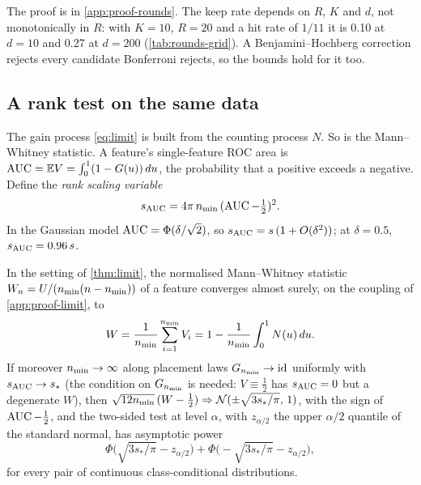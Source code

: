 The proof is in \cref{app:proof-rounds}. The keep rate depends on $R$, $K$ and $d$, not monotonically in $R$: with $K = 10$, $R = 20$ and a hit rate of $1/11$ it is 0.10 at $d = 10$ and 0.27 at $d = 200$ (\cref{tab:rounds-grid}). A Benjamini--Hochberg correction rejects every candidate Bonferroni rejects, so the bounds hold for it too.

\subsection{A rank test on the same data}\label{sec:rank}

The gain process \eqref{eq:limit} is built from the counting process $N$. So is the Mann--Whitney statistic. A feature's single-feature ROC area is $\operatorname{AUC} = \mathbb{E} V = \int_0^1 (1 - G(u))\,du$, the probability that a positive exceeds a negative. Define the \emph{rank scaling variable}
\begin{equation}\label{eq:sauc}
  s_{\mathrm{AUC}} = 4\pi\,n_{\min}\,(\operatorname{AUC} - \tfrac12)^2 .
\end{equation}
In the Gaussian model $\operatorname{AUC} = \Phi(\delta/\sqrt2)$, so $s_{\mathrm{AUC}} = s\,(1 + O(\delta^2))$; at $\delta = 0.5$, $s_{\mathrm{AUC}} = 0.96\,s$.

\begin{proposition}\label{prop:mw}
In the setting of \cref{thm:limit}, the normalised Mann--Whitney statistic $W_n = U/(n_{\min}(n-n_{\min}))$ of a feature converges almost surely, on the coupling of \cref{app:proof-limit}, to
\begin{equation}\label{eq:mw}
  W = \frac{1}{n_{\min}}\sum_{i=1}^{n_{\min}} V_i = 1 - \frac{1}{n_{\min}}\int_0^1 N(u)\,du .
\end{equation}
If moreover $n_{\min}\to\infty$ along placement laws $G_{n_{\min}} \to \mathrm{id}$ uniformly with $s_{\mathrm{AUC}} \to s_*$ (the condition on $G_{n_{\min}}$ is needed: $V \equiv \tfrac12$ has $s_{\mathrm{AUC}} = 0$ but a degenerate $W$), then $\sqrt{12n_{\min}}\,(W - \tfrac12) \Rightarrow \mathcal N(\pm\sqrt{3 s_*/\pi},\,1)$, with the sign of $\operatorname{AUC} - \tfrac12$, and the two-sided test at level $\alpha$, with $z_{\alpha/2}$ the upper $\alpha/2$ quantile of the standard normal, has asymptotic power
\begin{equation}\label{eq:mwpower}
  \Phi\bigl(\sqrt{3s_*/\pi} - z_{\alpha/2}\bigr) + \Phi\bigl(-\sqrt{3s_*/\pi} - z_{\alpha/2}\bigr),
\end{equation}
for every pair of continuous class-conditional distributions.
\end{proposition}

